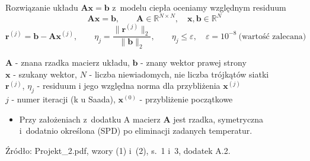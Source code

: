 \newcommand{\tightdisplays}{\setlength{\abovedisplayskip}{2pt}\setlength{\belowdisplayskip}{2pt}\setlength{\abovedisplayshortskip}{0pt}\setlength{\belowdisplayshortskip}{2pt}}
\newcommand{\eqtop}{\vspace{-\baselineskip}}
\newcommand{\src}[1]{\par\vfill{\color{mnMuted}\footnotesize #1\par}}

\begin{frame}{Rozwiązanie układu $\mathbf{A}\mathbf{x} = \mathbf{b}$ z~modelu ciepła oceniamy względnym residuum}
  \tightdisplays\eqtop
  \begin{equation}
    \mathbf{A}\mathbf{x} = \mathbf{b}, \qquad \mathbf{A} \in \mathbb{R}^{N \times N}, \quad \mathbf{x}, \mathbf{b} \in \mathbb{R}^{N}
  \end{equation}
  \begin{equation}
    \mathbf{r}^{(j)} = \mathbf{b} - \mathbf{A}\mathbf{x}^{(j)}, \qquad \eta_j = \frac{\|\mathbf{r}^{(j)}\|_2}{\|\mathbf{b}\|_2}, \qquad \eta_j \le \varepsilon, \quad \varepsilon = 10^{-8} \ \text{(wartość zalecana)}
  \end{equation}
  \par\vspace{1mm}
  {\footnotesize
  $\mathbf{A}$ - znana rzadka macierz układu, $\mathbf{b}$ - znany wektor prawej strony\\
  $\mathbf{x}$ - szukany wektor, $N$ - liczba niewiadomych, nie liczba trójkątów siatki\\
  $\mathbf{r}^{(j)}$, $\eta_j$ - residuum i jego względna norma dla przybliżenia $\mathbf{x}^{(j)}$\\
  $j$ - numer iteracji (k u Saada), $\mathbf{x}^{(0)}$ - przybliżenie początkowe\par}
  \begin{itemize}
    \item Przy założeniach z~dodatku A macierz $\mathbf{A}$ jest rzadka, symetryczna i~dodatnio określona (SPD) po eliminacji zadanych temperatur.
  \end{itemize}
  \src{Źródło: Projekt\_2.pdf, wzory (1) i~(2), s.~1 i~3, dodatek A.2.}
\end{frame}

